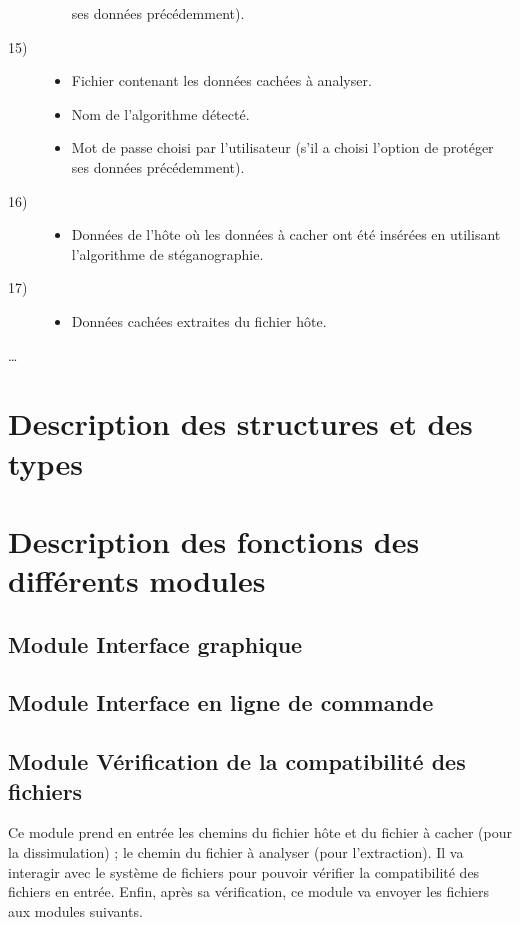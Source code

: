 \documentclass[11pt]{article}
\begin{document}
\begin{multicols}{2}
\begin{description}
\begin{itemize}
    ses données précédemment).
\end{itemize}
\item[15)]
\begin{itemize}
\item Fichier contenant les données cachées à analyser.
\item Nom de l'algorithme détecté.
\item Mot de passe choisi par l'utilisateur (s'il a choisi l'option de protéger
    ses données précédemment).
\end{itemize}
\item[16)]
\begin{itemize}
\item Données de l'hôte où les données à cacher ont été insérées en utilisant
    l'algorithme de stéganographie.
\end{itemize}
\item[17)]
\begin{itemize}
\item Données cachées extraites du fichier hôte.
\end{itemize}
\end{description}
  \ldots
\end{multicols}

\section{Description des structures et des types}

\section{Description des fonctions des différents modules}

\subsection{Module Interface graphique}
\subsection{Module Interface en ligne de commande}

\subsection{Module Vérification de la compatibilité des fichiers}

Ce module prend en entrée les chemins du fichier hôte et du fichier à 
cacher (pour la dissimulation) ; le chemin du fichier à analyser (pour 
l'extraction). Il va interagir avec le système de fichiers pour pouvoir 
vérifier la compatibilité des fichiers en entrée. 
Enfin, après sa vérification, ce module va envoyer les fichiers aux modules 
suivants. 
\newline
\end{document}
